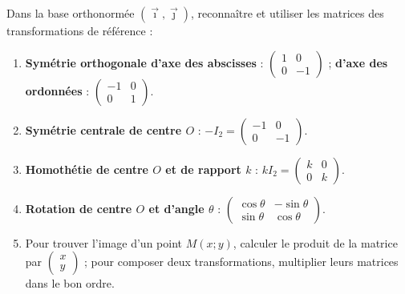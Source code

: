 \documentclass[11pt]{article}
\begin{document}
\begin{methode}
Dans la base orthonormée $(\vec{\imath},\vec{\jmath})$, reconnaître et utiliser les matrices des transformations de référence :
\begin{enumerate}
\item \textbf{Symétrie orthogonale d'axe des abscisses} : $\begin{pmatrix} 1 & 0 \\ 0 & -1 \end{pmatrix}$ ; \textbf{d'axe des ordonnées} : $\begin{pmatrix} -1 & 0 \\ 0 & 1 \end{pmatrix}$.
\item \textbf{Symétrie centrale de centre $O$} : $-I_2=\begin{pmatrix} -1 & 0 \\ 0 & -1 \end{pmatrix}$.
\item \textbf{Homothétie de centre $O$ et de rapport $k$} : $kI_2=\begin{pmatrix} k & 0 \\ 0 & k \end{pmatrix}$.
\item \textbf{Rotation de centre $O$ et d'angle $\theta$} : $\begin{pmatrix} \cos\theta & -\sin\theta \\ \sin\theta & \cos\theta \end{pmatrix}$.
\item Pour trouver l'image d'un point $M(x;y)$, calculer le produit de la matrice par $\begin{pmatrix} x \\ y \end{pmatrix}$ ; pour composer deux transformations, multiplier leurs matrices dans le bon ordre.
\end{enumerate}
\end{methode}
\end{document}
